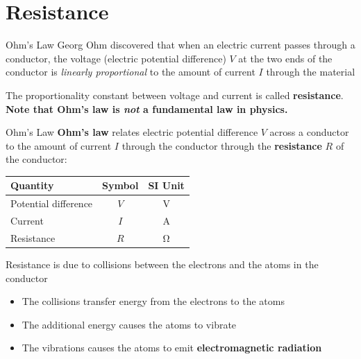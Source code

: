 \documentclass[12pt,aspectratio=169]{beamer}
\begin{document}
\section{Resistance}

\begin{frame}{Ohm's Law}
  Georg Ohm discovered that when an electric current passes through a conductor,
  the voltage (electric potential difference) $V$ at the two ends of the
  conductor is \emph{linearly proportional} to the amount of current $I$
  through the material
  \begin{center}
    \vspace{-.1in}
  \end{center}
  The proportionality constant between voltage and current is called
  \textbf{resistance}. \textbf{Note that Ohm's law is \emph{not} a fundamental
    law in physics.}
\end{frame}


\begin{frame}{Ohm's Law}
  \textbf{Ohm's law} relates electric potential difference $V$ across a
  conductor to the amount of current $I$ through the conductor through the
  \textbf{resistance} $R$ of the conductor:

  \begin{center}
    \begin{tabular}{l|c|c}
      \rowcolor{pink}
      \textbf{Quantity} & \textbf{Symbol} & \textbf{SI Unit} \\ \hline
      Potential difference & $V$ & \si\volt \\
      Current              & $I$ & \si\ampere \\
      Resistance           & $R$ & \si\ohm
    \end{tabular}
  \end{center}
  Resistance is due to collisions between the electrons and the atoms in the
  conductor
  \begin{itemize}
  \item The collisions transfer energy from the electrons to the atoms
  \item The additional energy causes the atoms to vibrate
  \item The vibrations causes the atoms to emit \textbf{electromagnetic
    radiation}
  \end{itemize}
\end{frame}
\end{document}
